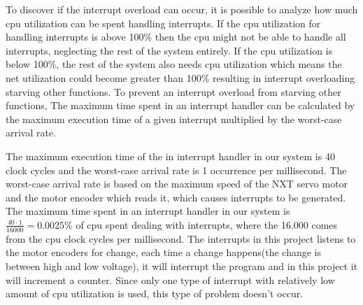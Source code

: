 To discover if the interrupt overload can occur, it is possible to analyze how much cpu utilization can be spent handling interrupts. If the cpu utilization for handling interrupts is above 100\% then the cpu might not be able to handle all interrupts, neglecting the rest of the system entirely. If the cpu utilization is below 100\%, the rest of the system also needs cpu utilization which means the net utilization could become greater than 100\% resulting in interrupt overloading starving other functions. \newline
To prevent an interrupt overload from starving other functions,
The maximum time spent in an interrupt handler can be calculated by the maximum execution time of a given interrupt multiplied by the worst-case arrival rate. 


The maximum execution time of the in interrupt handler in our system is 40 clock cycles and the worst-case arrival rate is 1 occurrence per millisecond. The worst-case arrival rate is based on the maximum speed of the NXT servo motor and the motor encoder which reads it, which causes interrupts to be generated. \newline
The maximum time spent in an interrupt handler in our system is \begin{math} \frac{40 \cdot 1}{16000} = 0.0025\% \end{math} of cpu spent dealing with interrupts, where the 16.000 comes from the cpu clock cycles per millisecond. The interrupts in this project listens to the motor encoders for change, each time a change happens(the change is between high and low voltage), it will interrupt the program and in this project it will increment a counter. Since only one type of interrupt with relatively low amount of cpu utilization is used, this type of problem doesn’t occur. 


